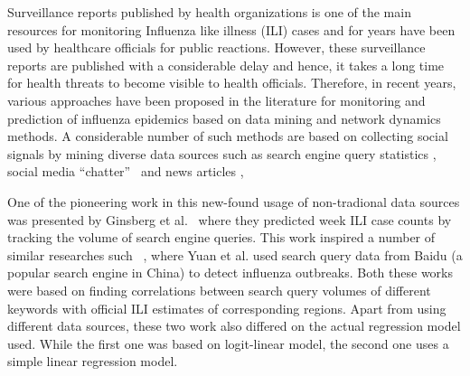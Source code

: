 Surveillance reports published by health organizations is one of the
main resources for monitoring Influenza like illness (ILI) cases and for
years have been used by healthcare officials for public reactions.
However, these surveillance reports are published with a considerable
delay and hence, it takes a long time for health threats to become
visible to health officials. Therefore, in recent years, various
approaches have been proposed in the literature for monitoring and
prediction of influenza epidemics based on data mining and network
dynamics methods. A considerable number of such methods are based on collecting
social signals by mining diverse data sources such as 
search engine query statistics \cite{ref1, ref2}, social
media ``chatter''~\cite{ref3, ref4, ref5, ref6, ref7} and news articles \cite{ref8},



One of the pioneering work in this new-found usage of non-tradional data sources 
was presented by Ginsberg et al.~\cite{ref2} where they predicted week ILI case counts
by tracking the volume of search engine queries. This work inspired a number of similar 
researches such ~\cite{ref1}, where Yuan et al. used search query data from Baidu (a popular
search engine in China) to detect influenza outbreaks. Both these works were based on finding 
correlations between search query volumes of different keywords with official ILI estimates 
of corresponding regions. Apart from using different data sources, 
these two work also differed on the actual regression model used. While the first one was based on 
logit-linear model, the second one uses a simple linear regression model. 


